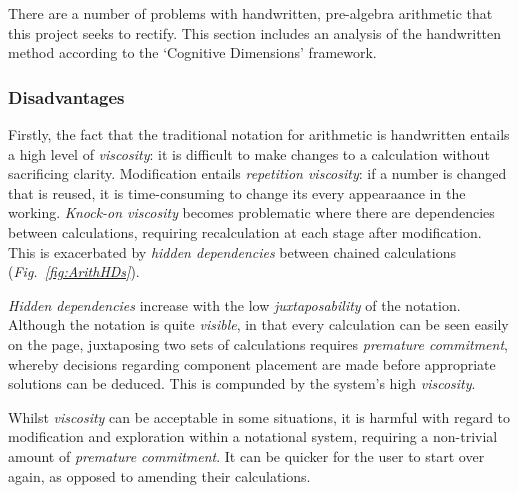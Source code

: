 \documentclass[12pt,twoside,notitlepage,xetex]{report}
\begin{document}
There are a number of problems with handwritten, pre-algebra arithmetic that this project seeks to rectify.  This section includes an analysis of the handwritten method according to the `Cognitive Dimensions' framework.

\subsubsection{Disadvantages}
Firstly, the fact that the traditional notation for arithmetic is handwritten entails a high level of \emph{viscosity}: it is difficult to make changes to a calculation without sacrificing clarity.  Modification entails \emph{repetition viscosity}: if a number is changed that is reused, it is time-consuming to change its every appearaance in the working.  \emph{Knock-on viscosity} becomes problematic where there are dependencies between calculations, requiring recalculation at each stage after modification.  This is exacerbated by \emph{hidden dependencies} between chained calculations (\emph{Fig.~\ref{fig:ArithHDs}}).

\emph{Hidden dependencies} increase with the low \emph{juxtaposability} of the notation.  Although the notation is quite \emph{visible}, in that every calculation can be seen easily on the page, juxtaposing two sets of calculations requires \emph{premature commitment}, whereby decisions regarding component placement are made before appropriate solutions can be deduced.  This is compunded by the system's high \emph{viscosity}.

Whilst \emph{viscosity} can be acceptable in some situations, it is harmful with regard to modification and exploration within a notational system, requiring a non-trivial amount of \emph{premature commitment}.  It can be quicker for the user to start over again, as opposed to amending their calculations.
\end{document}
